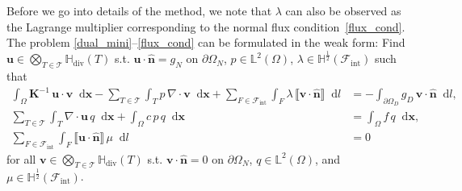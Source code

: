 \documentclass[12pt]{article}
\newcommand{\vect}[1]{\boldsymbol{\mathbf{#1}}}
\newcommand{\bcell}{T}
\newcommand{\bmesh}{{\vect{\mathcal T}}}
\newcommand{\bface}{F}
\newcommand{\bfaces}[1][]{{\vect{\mathcal F}_{\text{#1}}}}
\newcommand{\LTwoSpace}[1][\Omega]{{\mathbb L^2\left({#1}\right)}}
\newcommand{\HDivSpace}[1][\Omega]{{\mathbb H_\text{div}\left({#1}\right)}}
\newcommand{\HHalfSpace}[1][\bface]{{\mathbb H^{\frac{1}{2}}\left({#1}\right)}}
\newcommand*\diff{\mathop{}\!\mathrm{d}}
\begin{document}
	Before we go into details of the method, we note that $\lambda$ can also  be observed as the Lagrange multiplier corresponding to the normal flux condition~\eqref{flux_cond}. The problem \eqref{dual_mini}--\eqref{flux_cond} can be formulated in the weak form: Find $\vect u \in \bigotimes\limits_{\bcell\in\bmesh}\HDivSpace[\bcell]$ s.t. $\vect u \cdot \hat{\vect n} = g_N$ on $\partial\Omega_N$, $ p\in\LTwoSpace$, $\lambda\in\HHalfSpace[{\bfaces[int]}]$ such that
	\begin{equation}\label{weak_form}
		\begin{split}
			\int_{\Omega} \vect K^{-1}\,\vect u\cdot\vect v \diff \vect x - \sum_{\bcell\in\bmesh}\int_\bcell p\,\nabla\cdot\vect v \diff \vect x + \sum_{\bface\in\bfaces[int]}\int_{\bface} \lambda\,\llbracket\vect v\cdot\hat{\vect n}\rrbracket \diff l &= -\int_{\partial\Omega_D} g_D\,\vect v\cdot\hat{\vect n} \diff l, \\
			\sum_{\bcell\in\bmesh}\int_\bcell \nabla\cdot\vect u\,q \diff \vect x + \int_\Omega c\,p\,q \diff \vect x &= \int_\Omega f\,q \diff \vect x, \\
			\sum_{\bface\in\bfaces[int]}\int_{\bface} \llbracket\vect u\cdot\hat{\vect n}\rrbracket\,\mu \diff l &= 0
		\end{split}
	\end{equation}
	for all $\vect v \in \bigotimes\limits_{\bcell\in\bmesh}\HDivSpace[\bcell]$ s.t. $\vect v \cdot \hat{\vect n} = 0$ on $\partial\Omega_N$, $q \in \LTwoSpace[\Omega]$, and $\mu \in \HHalfSpace[{\bfaces[int]}]$.
	
	
\end{document}
